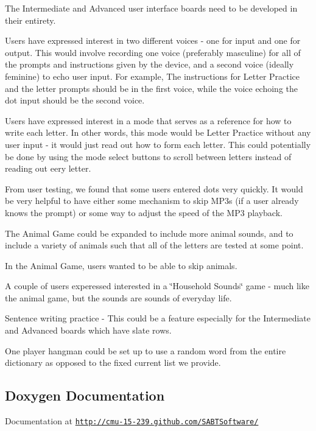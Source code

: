 \begin{DoxyItemize}
\item The Intermediate and Advanced user interface boards need to be developed in their entirety.
\item Users have expressed interest in two different voices -\/ one for input and one for output. This would involve recording one voice (preferably masculine) for all of the prompts and instructions given by the device, and a second voice (ideally feminine) to echo user input. For example, The instructions for Letter Practice and the letter prompts should be in the first voice, while the voice echoing the dot input should be the second voice.
\item Users have expressed interest in a mode that serves as a reference for how to write each letter. In other words, this mode would be Letter Practice without any user input -\/ it would just read out how to form each letter. This could potentially be done by using the mode select buttons to scroll between letters instead of reading out eery letter.
\item From user testing, we found that some users entered dots very quickly. It would be very helpful to have either some mechanism to skip M\-P3s (if a user already knows the prompt) or some way to adjust the speed of the M\-P3 playback.
\item The Animal Game could be expanded to include more animal sounds, and to include a variety of animals such that all of the letters are tested at some point.
\item In the Animal Game, users wanted to be able to skip animals.
\item A couple of users experessed interested in a \char`\"{}\-Household Sounds\char`\"{} game -\/ much like the animal game, but the sounds are sounds of everyday life.
\item Sentence writing practice -\/ This could be a feature especially for the Intermediate and Advanced boards which have slate rows.
\item One player hangman could be set up to use a random word from the entire dictionary as opposed to the fixed current list we provide.
\end{DoxyItemize}

\subsection*{Doxygen Documentation}

Documentation at \href{http://cmu-15-239.github.com/SABTSoftware/}{\tt http\-://cmu-\/15-\/239.\-github.\-com/\-S\-A\-B\-T\-Software/} 